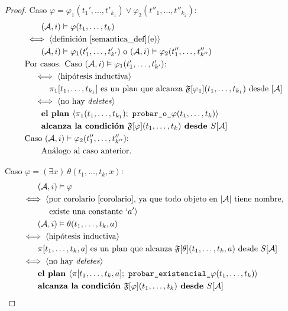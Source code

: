 \begin{proof}
Caso $\varphi = \varphi_1(t_1',\ldots,t'_{k_1}) \lor \varphi_2(t''_1,\ldots,t''_{k_2}) $:
\begin{alignat*}{1}
& \quad \quad (\mathcal{A}, i) \vDash \varphi(t_1,\ldots,t_k)\\
& \iff \langle \text{definición \ref{semantica_def}(e)} \rangle\\
& \quad \quad (\mathcal{A}, i) \vDash \varphi_1(t'_1,\ldots,t'_{k'}) 
\text{ o } (\mathcal{A}, i) \vDash \varphi_2(t''_1,\ldots,t''_{k''})\\
& \text{Por casos. Caso $(\mathcal{A}, i) \vDash \varphi_1(t'_1,\ldots,t'_{k'})$:}\\
& \quad \iff \langle \text{hipótesis inductiva} \rangle\\
& \quad \quad \quad \pi_1[t_1,\ldots,t_{k_1}] \text{ es un plan que alcanza 
$\mathfrak{F}[\varphi_1](t_1,\ldots,t_{k_1})$ desde $[\mathcal{A}]$}\\
& \quad \iff \langle \text{no hay \textit{deletes}} \rangle\\
& \quad \quad \textbf{el plan } \langle \pi_1(t_1,\ldots,t_{k_1});\
\texttt{probar\_o\_}\varphi(t_1,\ldots,t_k) \rangle \\
& \quad \quad \textbf{alcanza la condición }
\mathfrak{F}[\varphi](t_1,\ldots,t_k) \textbf{ desde } S[\mathcal{A}]\\
& \text{Caso $(\mathcal{A}, i) \vDash \varphi_2(t''_1,\ldots,t''_{k''})$:}\\
& \quad \quad \text{Análogo al caso anterior.}
\end{alignat*}

Caso $\varphi = (\exists x)\ \theta(t_1,\ldots,t_k,x):$
\begin{alignat*}{1}
& \quad \quad (\A, i) \models \varphi\\
& \iff \langle \text{por corolario \ref{corolario}, ya que todo objeto en $|\A|$
tiene nombre, }\\
& {\color{white} \iff \langle} \text{ existe una constante } `a' \rangle\\
& \quad \quad (\A, i) \models \theta(t_1,\ldots,t_k,a)\\
& \iff \tup{\text{hipótesis inductiva}}\\
& \quad \quad \pi[t_1,\ldots,t_k,a] \text{ es un plan que alcanza }
\FT[\theta](t_1,\ldots,t_k,a) \text{ desde } S[\A]\\
& \iff \tup{\text{no hay \textit{deletes}}}\\
& \quad \quad \textbf{el plan } \langle \pi[t_1,\ldots,t_k,a];\
\texttt{probar\_existencial\_}\varphi(t_1,\ldots,t_k)\rangle\\
& \quad \quad \textbf{alcanza la condición } \FT[\varphi](t_1,\ldots,t_k)
\textbf{ desde } S[\A]
\end{alignat*}


\end{proof}

